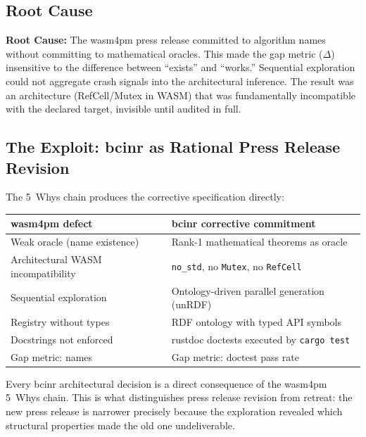 \documentclass[11pt,a4paper]{article}
\theoremstyle{definition}
\begin{document}
\subsection{Root Cause}

\begin{rulebox}
\textbf{Root Cause:} The wasm4pm press release committed to algorithm names without committing to mathematical oracles. This made the gap metric ($\Delta$) insensitive to the difference between ``exists'' and ``works.'' Sequential exploration could not aggregate crash signals into the architectural inference. The result was an architecture (RefCell/Mutex in WASM) that was fundamentally incompatible with the declared target, invisible until audited in full.
\end{rulebox}

\subsection{The Exploit: bcinr as Rational Press Release Revision}

The 5~Whys chain produces the corrective specification directly:

\begin{center}
\begin{tabular}{@{}l l@{}}
\toprule
\textbf{wasm4pm defect} & \textbf{bcinr corrective commitment} \\
\midrule
Weak oracle (name existence) & Rank-1 mathematical theorems as oracle \\
Architectural WASM incompatibility & \texttt{no\_std}, no \texttt{Mutex}, no \texttt{RefCell} \\
Sequential exploration & Ontology-driven parallel generation (unRDF) \\
Registry without types & RDF ontology with typed API symbols \\
Docstrings not enforced & rustdoc doctests executed by \texttt{cargo test} \\
Gap metric: names & Gap metric: doctest pass rate \\
\bottomrule
\end{tabular}
\end{center}

Every bcinr architectural decision is a direct consequence of the wasm4pm 5~Whys chain. This is what distinguishes press release revision from retreat: the new press release is narrower precisely because the exploration revealed which structural properties made the old one undeliverable.
\end{document}
